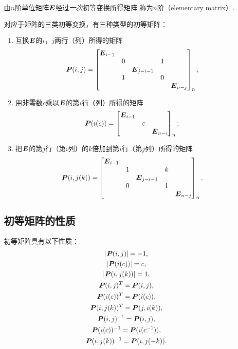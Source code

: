 \begin{definition}
由\(n\)阶单位矩阵\(\boldsymbol{E}\)经过\emph{一次}初等变换所得矩阵
称为\(n\)阶（elementary matrix）.
\end{definition}

对应于矩阵的三类初等变换，有三种类型的初等矩阵：
\begin{enumerate}
	\item 互换\(\boldsymbol{E}\)的\(i\)，\(j\)两行（列）所得的矩阵\begin{equation*}
		\boldsymbol{P}(i,j) = \begin{bmatrix}
			\boldsymbol{E}_{i-1} & & & \\
			& 0 & & 1 & \\
			& & \boldsymbol{E}_{j-i-1} & & \\
			& 1 & & 0 & \\
			& & & & \boldsymbol{E}_{n-j}
		\end{bmatrix}_n;
	\end{equation*}
	\item 用非零数\(c\)乘以\(\boldsymbol{E}\)的第\(i\)行（列）所得的矩阵\begin{equation*}
		\boldsymbol{P}(i(c)) = \begin{bmatrix}
			\boldsymbol{E}_{i-1} & & \\
			& c & \\
			& & \boldsymbol{E}_{n-i}
		\end{bmatrix}_n;
	\end{equation*}
	\item 把\(\boldsymbol{E}\)的第\(j\)行（第\(i\)列）的\(k\)倍加到第\(i\)行（第\(j\)列）所得的矩阵\begin{equation*}
		\boldsymbol{P}(i,j(k)) = \begin{bmatrix}
			\boldsymbol{E}_{i-1} & & & \\
			& 1 & & k & \\
			& & \boldsymbol{E}_{j-i-1} & & \\
			& 0 & & 1 & \\
			& & & & \boldsymbol{E}_{n-j}
		\end{bmatrix}_n.
	\end{equation*}
\end{enumerate}

\subsection{初等矩阵的性质}
\begin{property}\label{theorem:逆矩阵.初等矩阵的性质1}
初等矩阵具有以下性质：\begin{gather}
	\abs{\boldsymbol{P}(i,j)} = -1, \\
	\abs{\boldsymbol{P}(i(c))} = c, \\
	\abs{\boldsymbol{P}(i,j(k))} = 1, \\
	\boldsymbol{P}(i,j)^T = \boldsymbol{P}(i,j), \\
	\boldsymbol{P}(i(c))^T = \boldsymbol{P}(i(c)), \\
	\boldsymbol{P}(i,j(k))^T = \boldsymbol{P}(j,i(k)), \\
	\boldsymbol{P}(i,j)^{-1} = \boldsymbol{P}(i,j), \\
	\boldsymbol{P}(i(c))^{-1} = \boldsymbol{P}(i(c^{-1})), \\
	\boldsymbol{P}(i,j(k))^{-1} = \boldsymbol{P}(i,j(-k)).
\end{gather}
\end{property}

